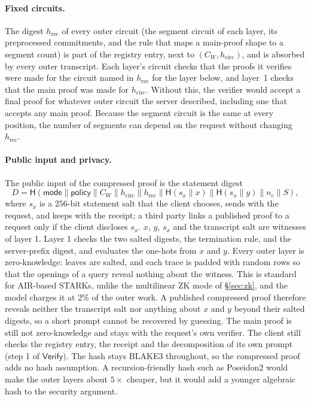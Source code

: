 \documentclass[11pt]{article}
\begin{document}
\paragraph{Fixed circuits.}
The digest \(h_{\mathrm{rec}}\) of every outer circuit (the segment circuit of each layer, its preprocessed commitments, and the rule that maps a main-proof shape to a segment count) is part of the registry entry, next to \((C_W, h_{\mathrm{circ}})\), and is absorbed by every outer transcript.
Each layer's circuit checks that the proofs it verifies were made for the circuit named in \(h_{\mathrm{rec}}\) for the layer below, and layer~1 checks that the main proof was made for \(h_{\mathrm{circ}}\).
Without this, the verifier would accept a final proof for whatever outer circuit the server described, including one that accepts any main proof.
Because the segment circuit is the same at every position, the number of segments can depend on the request without changing \(h_{\mathrm{rec}}\).

\paragraph{Public input and privacy.}
The public input of the compressed proof is the statement digest
\[
D = \mathsf{H}(\mathsf{mode} \| \mathsf{policy} \| C_W \| h_{\mathrm{circ}} \| h_{\mathrm{rec}} \| \mathsf{H}(s_x \| x) \| \mathsf{H}(s_x \| y) \| n_c \| S),
\]
where \(s_x\) is a \(256\)-bit statement salt that the client chooses, sends with the request, and keeps with the receipt; a third party links a published proof to a request only if the client discloses \(s_x\).
\(x\), \(y\), \(s_x\) and the transcript salt are witnesses of layer 1.
Layer 1 checks the two salted digests, the termination rule, and the server-prefix digest, and evaluates the one-hots from \(x\) and \(y\).
Every outer layer is zero-knowledge: leaves are salted, and each trace is padded with random rows so that the openings of a query reveal nothing about the witness.
This is standard for AIR-based STARKs, unlike the multilinear ZK mode of \S\ref{sec:zk}, and the model charges it at \(2\%\) of the outer work.
A published compressed proof therefore reveals neither the transcript salt nor anything about \(x\) and \(y\) beyond their salted digests, so a short prompt cannot be recovered by guessing.
The main proof is still not zero-knowledge and stays with the request's own verifier.
The client still checks the registry entry, the receipt and the decomposition of its own prompt (step 1 of \(\mathsf{Verify}\)).
The hash stays BLAKE3 throughout, so the compressed proof adds no hash assumption.
A recursion-friendly hash such as Poseidon2 would make the outer layers about \(5\times\) cheaper, but it would add a younger algebraic hash to the security argument.
\end{document}
